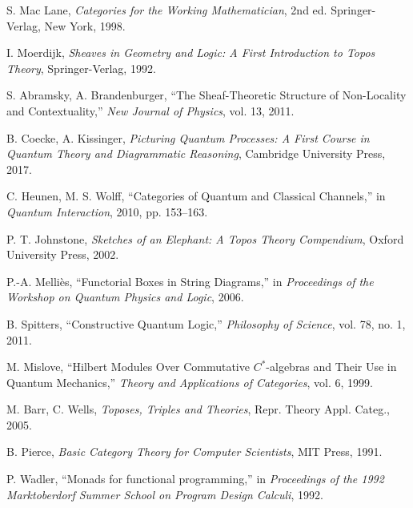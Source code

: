 \documentclass[11pt]{article}
\begin{document}
\begin{thebibliography}{99}

S. Mac Lane, \emph{Categories for the Working Mathematician}, 2nd ed. Springer-Verlag, New York, 1998.

I. Moerdijk, \emph{Sheaves in Geometry and Logic: A First Introduction to Topos Theory}, Springer-Verlag, 1992.

S. Abramsky, A. Brandenburger, ``The Sheaf-Theoretic Structure of Non-Locality and Contextuality,'' \emph{New Journal of Physics}, vol. 13, 2011.

B. Coecke, A. Kissinger, \emph{Picturing Quantum Processes: A First Course in Quantum Theory and Diagrammatic Reasoning}, Cambridge University Press, 2017.

C. Heunen, M. S. Wolff, ``Categories of Quantum and Classical Channels,'' in \emph{Quantum Interaction}, 2010, pp. 153--163.

P. T. Johnstone, \emph{Sketches of an Elephant: A Topos Theory Compendium}, Oxford University Press, 2002.

P.-A. Melli\`es, ``Functorial Boxes in String Diagrams,'' in \emph{Proceedings of the Workshop on Quantum Physics and Logic}, 2006.

B. Spitters, ``Constructive Quantum Logic,'' \emph{Philosophy of Science}, vol. 78, no. 1, 2011.

M. Mislove, ``Hilbert Modules Over Commutative $C^*$-algebras and Their Use in Quantum Mechanics,'' \emph{Theory and Applications of Categories}, vol. 6, 1999.

M. Barr, C. Wells, \emph{Toposes, Triples and Theories}, Repr. Theory Appl. Categ., 2005.

B. Pierce, \emph{Basic Category Theory for Computer Scientists}, MIT Press, 1991.

P. Wadler, ``Monads for functional programming,'' in \emph{Proceedings of the 1992 Marktoberdorf Summer School on Program Design Calculi}, 1992.

\end{thebibliography}
\end{document}
